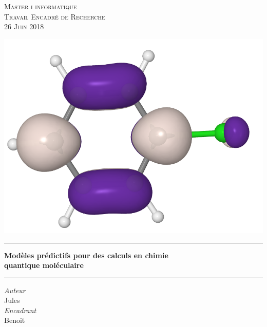\documentclass{report}
\begin{document}
\begin{titlepage}
	\centering
	
    \vspace*{0.7 cm}
    
   	\textsc{\LARGE Master i informatique\\Travail Encadré de Recherche\\[0.3cm]\large 26 Juin 2018}

	\vspace*{1.5cm}
    
	\includegraphics[scale=0.20]{images/iso_niveaux.png}

	\vspace*{0.5cm}

    
	\rule{\linewidth }{0.2 mm} 
    {\LARGE \textbf{Modèles prédictifs pour des calculs en chimie\\ quantique moléculaire}}
	\rule{\linewidth}{0.2 mm}
    
    \vspace*{1 cm}
	
	\begin{center}
	\vspace{0.3cm}
	
	\emph{Auteur}\\
	\vspace{0.1cm}
	Jules \\ 
	
	
	\vspace{0.5cm}
	\emph{Encadrant}\\
	\vspace{0.1cm}
	Benoit \\
	

\end{center}
\end{titlepage}
\end{document}
